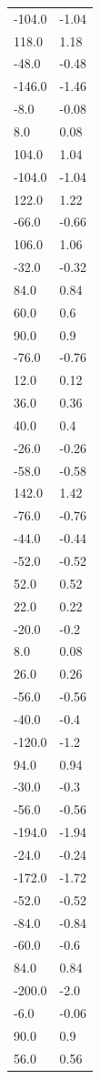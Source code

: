 \begin{longtable}{ll}
-104.0 & -1.04 \\
118.0 & 1.18 \\
-48.0 & -0.48 \\
-146.0 & -1.46 \\
-8.0 & -0.08 \\
8.0 & 0.08 \\
104.0 & 1.04 \\
-104.0 & -1.04 \\
122.0 & 1.22 \\
-66.0 & -0.66 \\
106.0 & 1.06 \\
-32.0 & -0.32 \\
84.0 & 0.84 \\
60.0 & 0.6 \\
90.0 & 0.9 \\
-76.0 & -0.76 \\
12.0 & 0.12 \\
36.0 & 0.36 \\
40.0 & 0.4 \\
-26.0 & -0.26 \\
-58.0 & -0.58 \\
142.0 & 1.42 \\
-76.0 & -0.76 \\
-44.0 & -0.44 \\
-52.0 & -0.52 \\
52.0 & 0.52 \\
22.0 & 0.22 \\
-20.0 & -0.2 \\
8.0 & 0.08 \\
26.0 & 0.26 \\
-56.0 & -0.56 \\
-40.0 & -0.4 \\
-120.0 & -1.2 \\
94.0 & 0.94 \\
-30.0 & -0.3 \\
-56.0 & -0.56 \\
-194.0 & -1.94 \\
-24.0 & -0.24 \\
-172.0 & -1.72 \\
-52.0 & -0.52 \\
-84.0 & -0.84 \\
-60.0 & -0.6 \\
84.0 & 0.84 \\
-200.0 & -2.0 \\
-6.0 & -0.06 \\
90.0 & 0.9 \\
56.0 & 0.56 \\

\end{longtable}
